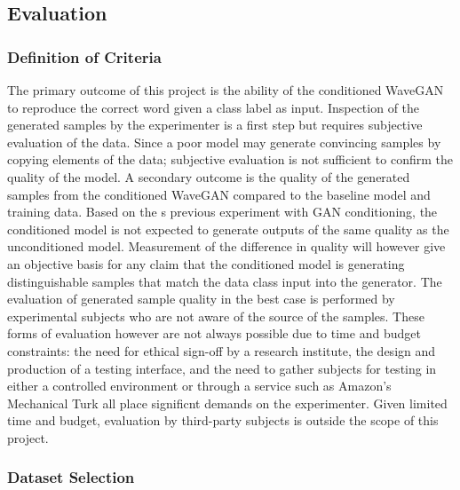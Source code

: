 \documentclass[a4paper, dvipsnames, titlepage]{article}
\begin{document}
\subsection{Evaluation}

\subsubsection{Definition of Criteria}

The primary outcome of this project is the ability of the conditioned WaveGAN to reproduce the correct word given a class label as input.
Inspection of the generated samples by the experimenter is a first step but requires subjective evaluation of the data.
Since a poor model may generate convincing samples by copying elements of the data; subjective evaluation is not sufficient to confirm the quality of the model.
\newline
\newline
A secondary outcome is the quality of the generated samples from the conditioned WaveGAN compared to the baseline model and training data.
Based on the \citeauthor{2014arXiv1411.1784M}s previous experiment with GAN conditioning, the conditioned model is not expected to generate outputs of the same quality as the unconditioned model.
Measurement of the difference in quality will however give an objective basis for any claim that the conditioned model is generating distinguishable samples that match the data class input into the generator.
\newline
\newline
The evaluation of generated sample quality in the best case is performed by experimental subjects who are not aware of the source of the samples.
These forms of evaluation however are not always possible due to time and budget constraints: the need for ethical sign-off by a research institute, the design and production of a testing interface, and the need to gather subjects for testing in either a controlled environment or through a service such as Amazon's Mechanical Turk all place significnt demands on the experimenter.
Given limited time and budget, evaluation by third-party subjects is outside the scope of this project.

\subsubsection{Dataset Selection}
\end{document}
